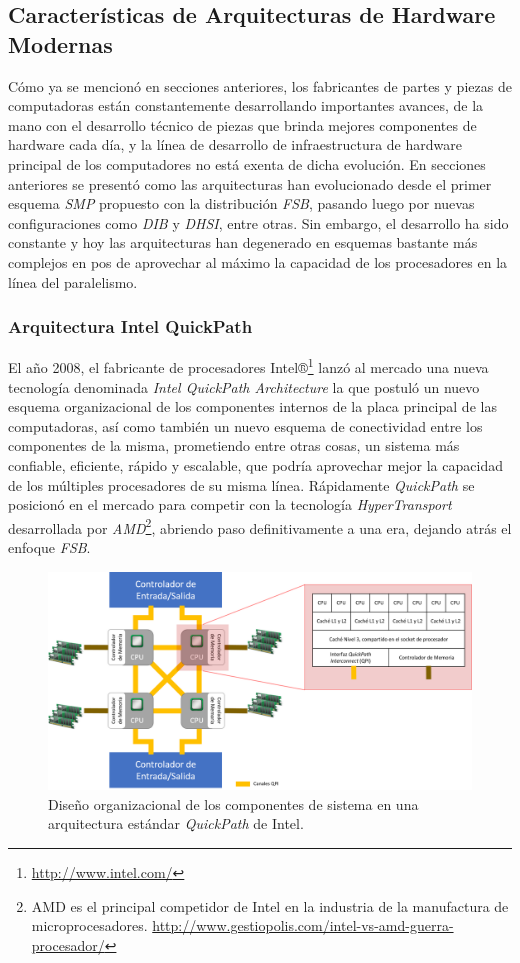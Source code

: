 \subsection{Características de Arquitecturas de Hardware Modernas}
Cómo ya se mencionó en secciones anteriores, los fabricantes de partes y piezas de computadoras están constantemente desarrollando importantes avances, de la mano con el desarrollo técnico de piezas que brinda mejores componentes de hardware cada día, y la línea de desarrollo de infraestructura de hardware principal de los computadores no está exenta de dicha evolución. En secciones anteriores se presentó como las arquitecturas han evolucionado desde el primer esquema \emph{SMP} propuesto con la distribución \emph{FSB}, pasando luego por nuevas configuraciones como \emph{DIB} y \emph{DHSI}, entre otras. Sin embargo, el desarrollo ha sido constante y hoy las arquitecturas han degenerado en esquemas bastante más complejos en pos de aprovechar al máximo la capacidad de los procesadores en la línea del paralelismo.

\subsubsection{Arquitectura Intel QuickPath}
El año 2008, el fabricante de procesadores Intel®\footnote{\url{http://www.intel.com/}} lanzó al mercado una nueva tecnología denominada \emph{Intel QuickPath Architecture} \cite{paper:quickpath} la que postuló un nuevo esquema organizacional de los componentes internos de la placa principal de las computadoras, así como también un nuevo esquema de conectividad entre los componentes de la misma, prometiendo entre otras cosas, un sistema más confiable, eficiente, rápido y escalable, que podría aprovechar mejor la capacidad de los múltiples procesadores de su misma línea. Rápidamente \emph{QuickPath} se posicionó en el mercado para competir con la tecnología \emph{HyperTransport} desarrollada por \emph{AMD}\footnote{AMD es el principal competidor de Intel en la industria de la manufactura de microprocesadores. \url{http://www.gestiopolis.com/intel-vs-amd-guerra-procesador/}}, abriendo paso definitivamente a una era, dejando atrás el enfoque \emph{FSB}.

\begin{figure}[!h]
	\centering
	\includegraphics[scale=.5]{imagenes/quickpath2.png}
	\caption{Diseño organizacional de los componentes de sistema en una arquitectura estándar \emph{QuickPath} de Intel.}
	\label{fig:quickpath}
\end{figure}

